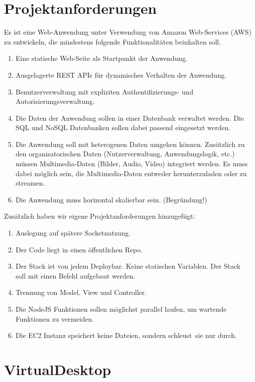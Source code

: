 \documentclass[a4paper, 12pt]{scrreprt}
\renewcommand\_{\textunderscore\allowbreak}
\begin{document}
\section{Projektanforderungen}
Es ist eine Web-Anwendung unter Verwendung von Amazon Web-Services (AWS) zu
entwickeln, die mindestens folgende Funktionalitäten beinhalten soll.
\begin{enumerate}
\item Eine statische Web-Seite als Startpunkt der Anwendung.
\item Ausgelagerte REST APIs für dynamisches Verhalten der Anwendung.
\item Benutzerverwaltung mit expliziten Authentifizierungs- und Autorisierungsverwaltung.
\item Die Daten der Anwendung sollen in einer Datenbank verwaltet werden. Die SQL und NoSQL Datenbanken sollen dabei passend eingesetzt werden.
\item Die Anwendung soll mit heterogenen Daten umgehen können. Zusätzlich zu den
organisatorischen Daten (Nutzerverwaltung, Anwendungslogik, etc.) müssen
Multimedia-Daten (Bilder, Audio, Video) integriert werden. Es muss dabei möglich
sein, die Multimedia-Daten entweder herunterzuladen oder zu streamen.
\item Die Anwendung muss horizontal skalierbar sein. (Begründung!)
\end{enumerate}
Zusätzlich haben wir eigene Projektanforderungen hinzugefügt:
\begin{enumerate}
\item Auslegung auf spätere Socketnutzung.
\item Der Code liegt in einen öffentlichen Repo.
\item Der Stack ist von jedem Deploybar. Keine statischen Variablen. Der Stack soll mit einen Befehl aufgebaut werden.
\item Trennung von Model, View und Controller. 
\item Die NodeJS Funktionen sollen möglichst parallel laufen, um wartende Funktionen zu vermeiden.
\item Die EC2 Instanz speichert keine Dateien, sondern \dq schleust\dq\ sie nur durch.
\end{enumerate}

\section{VirtualDesktop}
\end{document}
